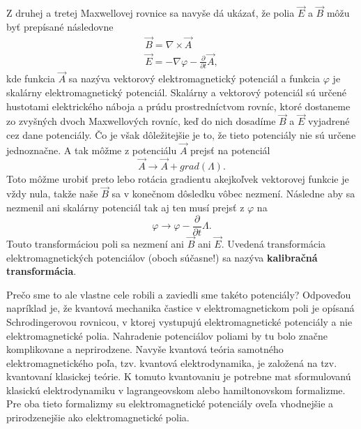 \documentclass[../../main.tex]{subfiles}
\begin{document}
Z druhej a tretej Maxwellovej rovnice sa navyše dá ukázať, že polia $\vec{E}$ a $\vec{B}$ môžu byť prepísané následovne 
\begin{equation}
\begin{gathered}
\vec{B} = \nabla \times \vec{A}\\
\vec{E} = -\nabla\varphi-\frac{\partial}{\partial t}\vec{A},
\end{gathered}
\end{equation}  
kde funkcia $\vec{A}$ sa nazýva vektorový elektromagnetický potenciál a funkcia $\varphi$ je skalárny elektromagnetický potenciál. Skalárny a vektorový potenciál sú určené hustotami elektrického náboja a prúdu prostredníctvom rovníc, ktoré dostaneme zo zvyšných dvoch Maxwellových rovníc, keď do nich dosadíme $\vec{B}$ a $\vec{E}$ vyjadrené cez dane potenciály. Čo je však dôležitejšie je to, že tieto potenciály nie sú určene jednoznačne. A tak môžme z potenciálu $\vec{A}$ prejsť na potenciál 
\begin{equation}
\vec{A} \rightarrow \vec{A}+grad(\Lambda).
\end{equation}
Toto môžme urobiť preto lebo rotácia gradientu akejkoľvek vektorovej funkcie je vždy nula, takže naše $\vec{B}$ sa v konečnom dôsledku vôbec nezmení. Následne aby sa nezmenil ani skalárny potenciál tak aj ten musí prejsť z $\varphi$ na
\begin{equation}
\varphi \rightarrow \varphi -\frac{\partial}{\partial t}\Lambda.
\end{equation}
Touto transformáciou poli sa nezmení ani $\vec{B}$ ani $\vec{E}$. Uvedená transformácia elektromagnetických potenciálov (oboch súčasne!) sa nazýva \textbf{kalibračná transformácia}.

Prečo sme to ale vlastne cele robili a zaviedli sme takéto potenciály? Odpoveďou napríklad je, že kvantová mechanika častice v elektromagnetickom poli je opísaná Schrodingerovou rovnicou, v ktorej vystupujú elektromagnetické potenciály a nie elektromagnetické polia. Nahradenie potenciálov poliami by tu bolo značne komplikovane a neprirodzene. Navyše kvantová teória samotného elektromagnetického poľa, tzv. kvantová elektrodynamika, je založená na tzv. kvantovaní klasickej teórie. K tomuto kvantovaniu je potrebne mat sformulovanú klasickú elektrodynamiku v lagrangeovskom alebo hamiltonovskom formalizme. Pre oba tieto formalizmy su elektromagnetické potenciály oveľa vhodnejšie a prirodzenejšie ako elektromagnetické polia.
\end{document}
